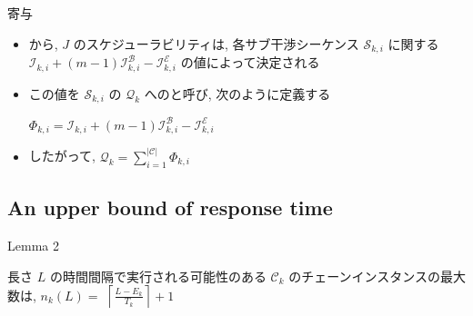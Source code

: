 \begin{frame}[label=defPhi]{寄与}
    \begin{itemize}
        \item {} から, $J$ のスケジューラビリティは, 各サブ干渉シーケンス $\mathcal{S}_{k, i}$ に関する $\mathcal{I}_{k, i}+(m-1) \mathcal{I}_{k, i}^{\mathcal{B}}-\mathcal{I}_{k, i}^{\mathcal{E}}$ の値によって決定される
        \item この値を $\mathcal{S}_{k, i}$ の $\mathcal{Q}_{k}$ へのと呼び, 次のように定義する
              \begin{definition}
                  $\Phi_{k, i}=\mathcal{I}_{k, i}+(m-1) \mathcal{I}_{k, i}^{\mathcal{B}}-\mathcal{I}_{k, i}^{\mathcal{E}}$
              \end{definition}
              \vspace{5mm}
        \item したがって, $\mathcal{Q}_{k}=\sum_{i=1}^{|\mathcal{C}|} \Phi_{k, i}$
    \end{itemize}
\end{frame}


\subsection{An upper bound of response time}
\label{ssec: an_upper_bound_of_response_time}


\begin{frame}[label=lemma3]{Lemma 2}
    \begin{lemma}[]
        長さ $L$ の時間間隔で実行される可能性のある $\mathcal{C}_{k}$ のチェーンインスタンスの最大数は, $n_{k}(L)=$  $\left\lceil\frac{L-E_{k}}{T_{k}}\right\rceil+1$
    \end{lemma}
\end{frame}

